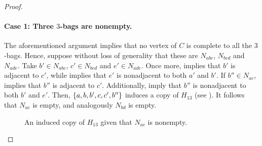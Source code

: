 \begin{proof}
    \paragraph{Case 1: Three $3$-bags are nonempty.} The aforementioned argument
    implies that no vertex of $C$ is complete to all the $3$-bags. Hence,
    suppose without loss of generality that these are $N_{abc}$, $N_{bcd}$ and
    $N_{ade}$. Take $b'\in N_{abc}$, $c'\in N_{bcd}$ and $e'\in N_{ade}$. Once
    more,  implies that $b'$ is adjacent to $c'$, while
     implies that $e'$ is nonadjacent to both $a'$ and
    $b'$. If $b''\in N_{ac}$,  implies that $b''$ is
    adjacent to $c'$. Additionally, 
    imply that $b''$ is nonadjacent to both $b'$ and $e'$. Then,
    $\left\{a,b,b',c,c',b''\right\}$ induces a copy of $H_{13}$ (see
    ). It follows that $N_{ac}$ is empty, and
    analogously $N_{bd}$ is empty.

    \begin{figure}[htb!]
        \centering
        \caption{An induced copy of $H_{13}$ given that $N_{ac}$ is nonempty.}
        \label{fig:2_bag_nonempty}
    \end{figure}


\end{proof}
